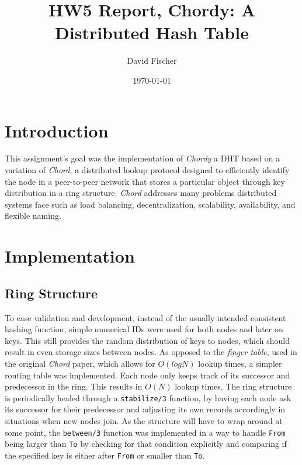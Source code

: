 \documentclass[a4paper, 11pt]{article}
\title{HW5 Report, Chordy: A Distributed Hash Table}
\author{David Fischer}
\date{\today{}}
\begin{document}
\maketitle

\section{Introduction}
This assignment's goal was the implementation of \textit{Chordy} a DHT based on a variation of \textit{Chord}, a distributed lookup protocol designed to efficiently identify the node in a peer-to-peer network that stores a particular object through key distribution in a ring structure.
\textit{Chord} addresses many problems distributed systems face such as load balancing, decentralization, scalability, availability, and flexible naming.

\section{Implementation}

\subsection{Ring Structure}

To ease validation and development, instead of the usually intended consistent hashing function, simple numerical IDs were used for both nodes and later on keys. This still provides the random distribution of keys to nodes, which should result in even storage sizes between nodes.
As opposed to the \textit{finger table}, used in the original \textit{Chord} paper, which allows for $O(log N)$ lookup times, a simpler routing table was implemented. Each node only keeps track of its successor and predecessor in the ring. This results in $O(N)$ lookup times.
The ring structure is periodically healed through a \texttt{stabilize/3} function, by having each node ask its successor for their predecessor and adjusting its own records accordingly in situations when new nodes join.
As the structure will have to wrap around at some point, the \texttt{between/3} function was implemented in a way to handle \texttt{From} being larger than \texttt{To} by checking for that condition explicitly and comparing if the specified key is either after \texttt{From} or smaller than \texttt{To}.
\end{document}
